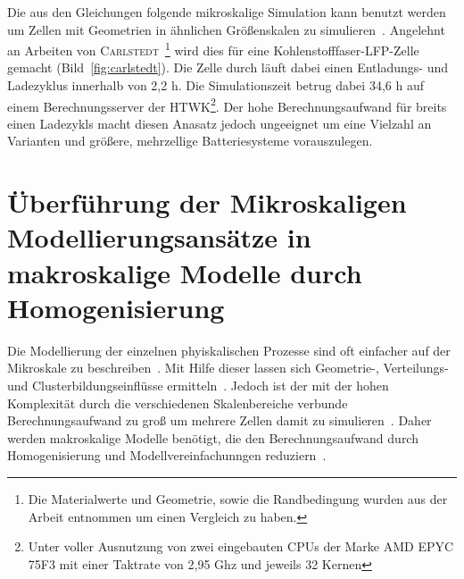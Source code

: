 Die aus den Gleichungen folgende mikroskalige Simulation kann benutzt werden um Zellen mit Geometrien in ähnlichen Größenskalen zu simulieren~\cite{Plett2015}. Angelehnt an Arbeiten von \textsc{Carlstedt}~\cite{Carlstedt2022b}\footnote{Die Materialwerte und Geometrie, sowie die Randbedingung wurden aus der Arbeit entnommen um einen Vergleich zu haben.} wird dies für eine Kohlenstofffaser-LFP-Zelle gemacht (Bild~\ref{fig:carlstedt}). Die Zelle durch läuft dabei einen Entladungs- und Ladezyklus innerhalb von 2,2 h. Die Simulationszeit betrug dabei 34,6 h auf einem Berechnungsserver der HTWK\footnote{Unter voller Ausnutzung von zwei eingebauten CPUs der Marke AMD EPYC 75F3 mit einer Taktrate von 2,95 Ghz und jeweils 32 Kernen}. Der hohe Berechnungsaufwand für breits einen Ladezykls macht diesen Anasatz jedoch ungeeignet um eine Vielzahl an Varianten und größere, mehrzellige Batteriesysteme vorauszulegen.




\section{\label{sec:homogenisation}Überführung der Mikroskaligen Modellierungsansätze in makroskalige Modelle durch Homogenisierung}

Die Modellierung der einzelnen phyiskalischen Prozesse sind oft einfacher auf der Mikroskale zu beschreiben~\cite{Plett2015}. Mit Hilfe dieser lassen sich Geometrie-, Verteilungs- und Clusterbildungseinflüsse ermitteln~\cite{Newman2021}. Jedoch ist der mit der hohen Komplexität durch die verschiedenen Skalenbereiche verbunde Berechnungsaufwand zu groß um mehrere Zellen damit zu simulieren~\cite{Liu2019}. Daher werden makroskalige Modelle benötigt, die den Berechnungsaufwand durch Homogenisierung und Modellvereinfachunngen reduziern~\cite{Plett2015}.

